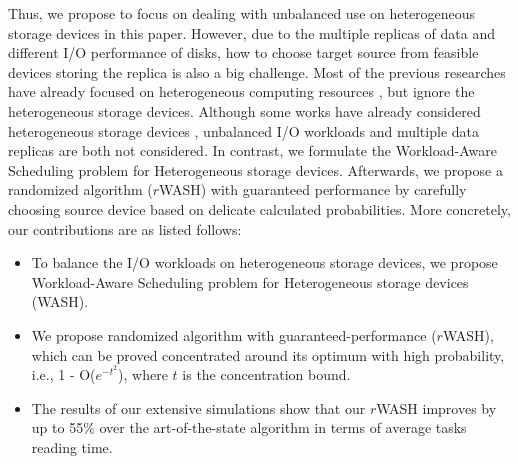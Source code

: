 \documentclass[conference]{IEEEtran}
\begin{document}
 
Thus, we propose to focus on dealing with unbalanced use on heterogeneous storage devices in this paper. However, due to the multiple replicas of data and different I/O performance of disks, how to choose target source from feasible devices storing the replica is also a big challenge.
Most of the previous researches have already focused on heterogeneous computing resources \cite{b25}\cite{b26}\cite{b35}\cite{b36}, but ignore the heterogeneous storage devices. Although some works have already considered heterogeneous storage devices \cite{b6}\cite{b7}, unbalanced I/O workloads and multiple data replicas are both not considered. In contrast, we formulate the Workload-Aware Scheduling problem for Heterogeneous storage devices. Afterwards, we propose a randomized algorithm ($r$WASH) with guaranteed performance by carefully choosing source device based on delicate calculated probabilities.
More concretely, our contributions are as listed follows: 

\begin{itemize}
\item To balance the I/O workloads on heterogeneous storage devices, we propose Workload-Aware Scheduling problem for Heterogeneous storage devices (WASH).
\item We propose randomized algorithm with guaranteed-performance ($r$WASH), which can be proved concentrated around its optimum with high probability, i.e., 1 - O($e^{-t^2}$), where $t$ is the concentration bound.
\item The results of our extensive simulations show that our $r$WASH improves by up to 55\% over the art-of-the-state algorithm in terms of average tasks reading time.
\end{itemize}
\end{document}
